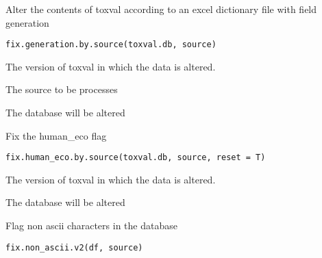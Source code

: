 \documentclass[letterpaper]{book}
\begin{document}
%
\begin{Description}\relax
Alter the contents of toxval according to an excel dictionary file with field generation
\end{Description}
%
\begin{Usage}
\begin{verbatim}
fix.generation.by.source(toxval.db, source)
\end{verbatim}
\end{Usage}
%
\begin{Arguments}
\begin{ldescription}
\item[\code{toxval.db}] The version of toxval in which the data is altered.

\item[\code{source}] The source to be processes
\end{ldescription}
\end{Arguments}
%
\begin{Value}
The database will be altered
\end{Value}
%
\begin{Description}\relax
Fix the human\_eco flag
\end{Description}
%
\begin{Usage}
\begin{verbatim}
fix.human_eco.by.source(toxval.db, source, reset = T)
\end{verbatim}
\end{Usage}
%
\begin{Arguments}
\begin{ldescription}
\item[\code{toxval.db}] The version of toxval in which the data is altered.
\end{ldescription}
\end{Arguments}
%
\begin{Value}
The database will be altered
\end{Value}
%
\begin{Description}\relax
Flag non ascii characters in the database
\end{Description}
%
\begin{Usage}
\begin{verbatim}
fix.non_ascii.v2(df, source)
\end{verbatim}
\end{Usage}
\end{document}
